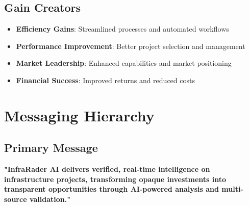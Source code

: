 \documentclass[business]{../templates/infraradar-main}
\begin{document}
\subsection{Gain Creators}
\begin{itemize}
    \item \textbf{Efficiency Gains}: Streamlined processes and automated workflows
    \item \textbf{Performance Improvement}: Better project selection and management
    \item \textbf{Market Leadership}: Enhanced capabilities and market positioning
    \item \textbf{Financial Success}: Improved returns and reduced costs
\end{itemize}

\section{Messaging Hierarchy}

\subsection{Primary Message}
\textbf{"InfraRader AI delivers verified, real-time intelligence on infrastructure projects, transforming opaque investments into transparent opportunities through AI-powered analysis and multi-source validation."}
\end{document}
